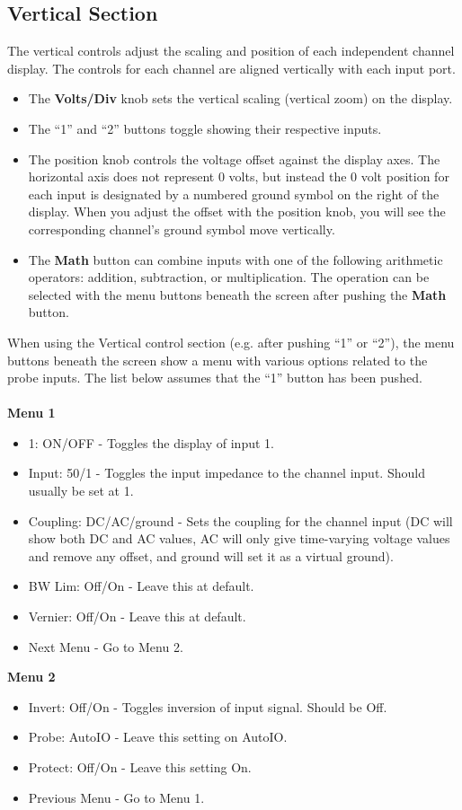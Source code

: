 \documentclass{article}
\begin{document}
\subsection{Vertical Section}
The vertical controls adjust the scaling and position of each independent channel display. The controls for each channel are aligned vertically with each input port.
\begin{itemize}
\item The \textbf{Volts/Div} knob sets the vertical scaling (vertical zoom) on the display.
\item The ``1'' and ``2'' buttons toggle showing their respective inputs.
\item The position knob controls the voltage offset against the display axes. The horizontal axis does not represent 0 volts, but instead the 0 volt position for each input is designated by a numbered ground symbol on the right of the display. When you adjust the offset with the position knob, you will see the corresponding channel's ground symbol move vertically.
\item The \textbf{Math} button can combine inputs with one of the following arithmetic operators: addition, subtraction, or multiplication. The operation can be selected with the menu buttons beneath the screen after pushing the \textbf{Math} button. 
\end{itemize}

When using the Vertical control section (e.g. after pushing ``1'' or ``2''), the menu buttons beneath the screen show a menu with various options related to the probe inputs. The list below assumes that the ``1'' button has been pushed.
~\\~\\
\textbf{Menu 1}
\begin{itemize}
\item 1: ON/OFF  -  Toggles the display of input 1.
\item Input: \unit{50}{\ohm}/\unit{1}{\mega\ohm}  -  Toggles the input impedance to the channel input. Should usually be set at \unit{1}{\mega\ohm}.
\item Coupling: DC/AC/ground  -  Sets the coupling for the channel input (DC will show both DC and AC values, AC will only give time-varying voltage values and remove any offset, and ground will set it as a virtual ground).
\item BW Lim: Off/On  -  Leave this at default.
\item Vernier: Off/On  -  Leave this at default.
\item Next Menu  -  Go to Menu 2.
\end{itemize}
\textbf{Menu 2}
\begin{itemize}
\item Invert: Off/On  -  Toggles inversion of input signal. Should be Off.
\item Probe: AutoIO  -  Leave this setting on AutoIO.
\item Protect: Off/On  -  Leave this setting On.
\item Previous Menu  -  Go to Menu 1.
\end{itemize}
\end{document}
